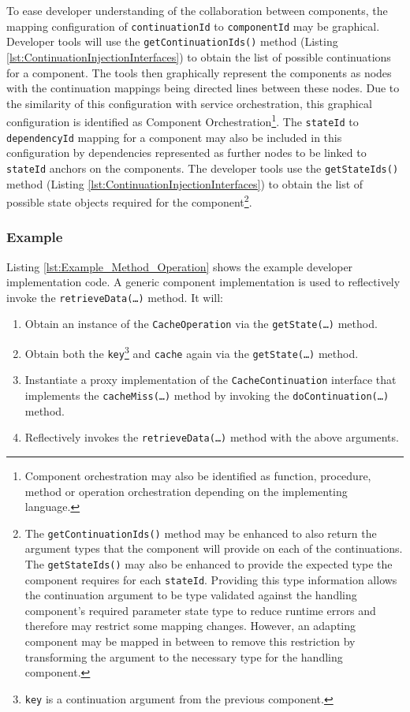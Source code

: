 \documentclass[prodmode]{style/acmlarge}
\begin{document}
To ease developer understanding of the collaboration between components, the
mapping configuration of \texttt{continuationId}  to \texttt{componentId} may be
graphical.  Developer tools will use the \texttt{getContinuationIds()} method
(Listing \ref{lst:ContinuationInjectionInterfaces}) to obtain the list of possible
continuations for a component.  The tools then graphically represent the
components as nodes with the continuation mappings being directed lines between
these nodes.  Due to the similarity of this configuration with service
orchestration, this graphical configuration is identified as Component
Orchestration\footnote{Component orchestration may also be identified as
function, procedure, method or operation orchestration depending on the
implementing language.}.  The \texttt{stateId} to \texttt{dependencyId} mapping
for a component may also be included in this configuration by dependencies
represented as further nodes to be linked to \texttt{stateId} anchors on the
components.  The developer tools use the \texttt{getStateIds()} method (Listing
\ref{lst:ContinuationInjectionInterfaces}) to obtain the list of possible state
objects required for the component\footnote{The \texttt{getContinuationIds()}
method may be enhanced to also return the argument types that the component will
provide on each of the continuations.  The \texttt{getStateIds()} may also be
enhanced to provide the expected type the component requires for each
\texttt{stateId}.  Providing this type information allows the continuation
argument to be type validated against the handling component's required
parameter state type to reduce runtime errors and therefore may restrict some
mapping changes.  However, an adapting component may be mapped in between to
remove this restriction by transforming the argument to the necessary type for
the handling component.}.


\subsubsection*{Example}

Listing \ref{lst:Example_Method_Operation} shows the example developer
implementation code.  A generic component implementation is used to reflectively
invoke the \texttt{retrieveData(\ldots)} method. It will:
\begin{enumerate}
  \item Obtain an instance of the \texttt{CacheOperation} via the \texttt{getState(\ldots)} method.
  \item Obtain both the \texttt{key}\footnote{\texttt{key} is a continuation argument from the previous component.} and \texttt{cache} again via the \texttt{getState(\ldots)} method.
  \item Instantiate a proxy implementation of the \texttt{CacheContinuation} interface that implements the \texttt{cacheMiss(\ldots)} method by invoking the \texttt{doContinuation(\ldots)} method. 
  \item Reflectively invokes the \texttt{retrieveData(\ldots)} method with the above arguments.
\end{enumerate}
\end{document}
